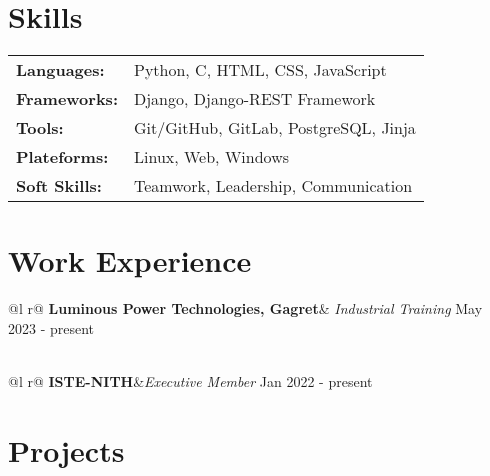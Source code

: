 \documentclass[a4paper,12pt]{article}
\begin{document}
\section{Skills}
\begin{tabularx}{\linewidth}{@{}l X@{}}
\textbf{Languages:} &  \normalsize{Python, C, HTML, CSS, JavaScript}\\
\textbf{Frameworks:}  &  \normalsize{Django, Django-REST Framework}\\  
\textbf{Tools:} &  \normalsize{Git/GitHub, GitLab, PostgreSQL, Jinja} \\
\textbf{Plateforms:} &  \normalsize{Linux, Web, Windows}\\
\textbf{Soft Skills:} &  \normalsize{Teamwork, Leadership, Communication}\\
\end{tabularx}

\section{Work Experience}

\begin{tabularx}{\linewidth}{ @{}l r@{} }
\textbf{Luminous Power Technologies, Gagret}& \emph{Industrial Training} \hfill May 2023 - present \\[3.75pt]
  \\
\end{tabularx}

\begin{tabularx}{\linewidth}{ @{}l r@{} }
\textbf{ISTE-NITH}&\emph{Executive Member} \hfill Jan 2022 - present \\[3.75pt]
\end{tabularx}

\section{Projects}
\end{document}
